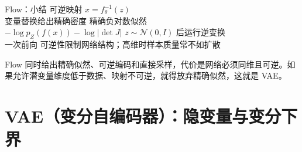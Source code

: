 \documentclass[aspectratio=169,10pt,UTF8,fontset=none]{ctexbeamer}
\begin{document}
\begin{frame}{Flow：小结}
  \centering
  \fourcard%
    {可逆映射 $x=f_\theta^{-1}(z)$\\变量替换给出精确密度}%
    {精确负对数似然\\$-\log p_Z(f(x))-\log|\det J|$}%
    {$z\sim\mathcal N(0,I)$ 后运行逆变换\\一次前向}%
    {可逆性限制网络结构；高维时样本质量常不如扩散}
  \vfill
  \begin{takeaway}
    Flow 同时给出精确似然、可逆编码和直接采样，代价是网络必须同维且可逆。如果允许潜变量维度低于数据、映射不可逆，就得放弃精确似然，这就是 VAE。
  \end{takeaway}
\end{frame}

\section{VAE（变分自编码器）：隐变量与变分下界}

\newcommand{\vaeface}[2]{%
  \begin{scope}[shift={#1}]
    \fill[GMist] (0,0) rectangle (14,14);
    \begin{scope}[opacity=#2]
      \fill[GAmber] (7,7) circle (5.6);
      \draw[GOrange,line width=0.6pt] (7,7) circle (5.6);
      \fill[GNavy] (5,8.6) circle (0.7);
      \fill[GNavy] (9,8.6) circle (0.7);
      \draw[GNavy,line width=0.7pt] (4.6,5.4) .. controls (6,3.6) and (8,3.6) .. (9.4,5.4);
    \end{scope}
    \draw[GSlate!50] (0,0) rectangle (14,14);
  \end{scope}}
\newcommand{\vaecode}[1]{%
  \begin{scope}[shift={#1}]
    \foreach \k in {0,1,2}{\draw[GOrange,fill=GAmber] (0,\k*4) rectangle ++(4,4);}
  \end{scope}}
\end{document}
